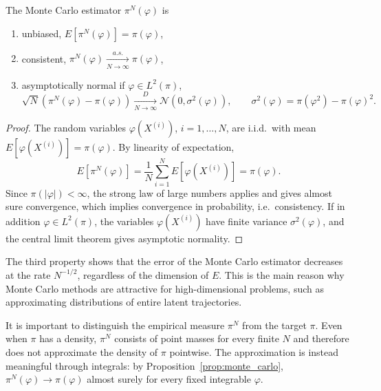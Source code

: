 \begin{proposition}
    \label{prop:monte_carlo}
    The Monte Carlo estimator $\pi^N(\varphi)$ is
    \begin{enumerate}
        \item unbiased, $E[\pi^N(\varphi)] = \pi(\varphi)$,
        \item consistent, $\pi^N(\varphi)\xrightarrow[N\to\infty]{a.s.}\pi(\varphi)$,
        \item asymptotically normal if $\varphi\in L^2(\pi)$,
        \begin{equation}
            \sqrt{N}\left(\pi^N(\varphi)-\pi(\varphi)\right)\xrightarrow[N\to\infty]{D}\mathcal{N}\left(0,\sigma^2(\varphi)\right), \qquad \sigma^2(\varphi) = \pi(\varphi^2)-\pi(\varphi)^2.
        \end{equation}
    \end{enumerate}
\end{proposition}
\begin{proof}
    The random variables $\varphi(X^{(i)})$, $i=1,\ldots,N$, are i.i.d.\ with mean $E[\varphi(X^{(i)})] = \pi(\varphi)$. By linearity of expectation,
    \begin{equation}
        E[\pi^N(\varphi)] = \frac{1}{N}\sum_{i=1}^{N}E[\varphi(X^{(i)})] = \pi(\varphi).
    \end{equation}
    Since $\pi(|\varphi|)<\infty$, the strong law of large numbers applies and gives almost sure convergence, which implies convergence in probability, i.e.\ consistency. If in addition $\varphi\in L^2(\pi)$, the variables $\varphi(X^{(i)})$ have finite variance $\sigma^2(\varphi)$, and the central limit theorem gives asymptotic normality.
\end{proof}

The third property shows that the error of the Monte Carlo estimator decreases at the rate $N^{-1/2}$, regardless of the dimension of $E$. This is the main reason why Monte Carlo methods are attractive for high-dimensional problems, such as approximating distributions of entire latent trajectories.

It is important to distinguish the empirical measure $\pi^N$ from the target $\pi$. Even when $\pi$ has a density, $\pi^N$ consists of point masses for every finite $N$ and therefore does not approximate the density of $\pi$ pointwise. The approximation is instead meaningful through integrals: by Proposition~\ref{prop:monte_carlo}, $\pi^N(\varphi)\to\pi(\varphi)$ almost surely for every fixed integrable $\varphi$.

